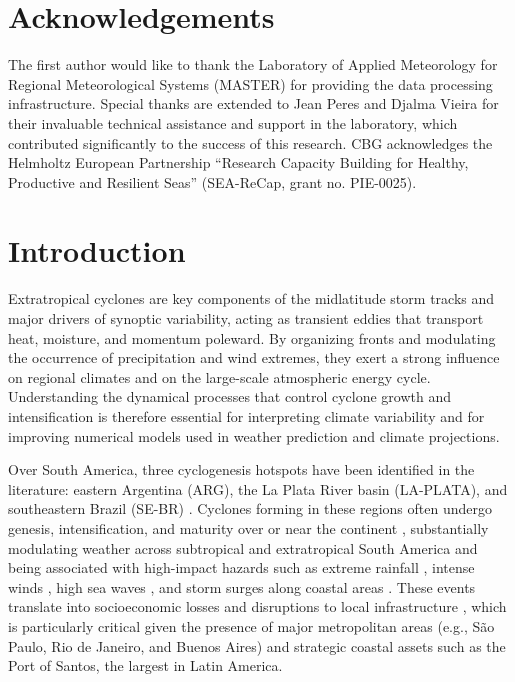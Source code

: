 \documentclass[pdflatex,sn-chicago]{sn-jnl}%
\theoremstyle{plain}
\theoremstyle{definition}
\theoremstyle{remark}
\theoremstyle{definition}
\begin{document}
\section*{Acknowledgements}

The first author would like to thank the Laboratory of Applied Meteorology for Regional Meteorological Systems (MASTER) for providing the data processing infrastructure. Special thanks are extended to Jean Peres and Djalma Vieira for their invaluable technical assistance and support in the laboratory, which contributed significantly to the success of this research. CBG acknowledges the Helmholtz European Partnership “Research Capacity Building for Healthy, Productive and Resilient Seas” (SEA-ReCap, grant no. PIE-0025).

\section{Introduction}\label{sec1}

Extratropical cyclones are key components of the midlatitude storm tracks and major drivers of synoptic variability, acting as transient eddies that transport heat, moisture, and momentum poleward. By organizing fronts and modulating the occurrence of precipitation and wind extremes, they exert a strong influence on regional climates and on the large-scale atmospheric energy cycle. Understanding the dynamical processes that control cyclone growth and intensification is therefore essential for interpreting climate variability and for improving numerical models used in weather prediction and climate projections.

Over South America, three cyclogenesis hotspots have been identified in the literature: eastern Argentina (ARG), the La Plata River basin (LA-PLATA), and southeastern Brazil (SE-BR) \citep{gan1991surface,hoskins2005new,gramcianinov2019properties,crespo2021potential}. Cyclones forming in these regions often undergo genesis, intensification, and maturity over or near the continent \citep{couto2024new}, substantially modulating weather across subtropical and extratropical South America and being associated with high-impact hazards such as extreme rainfall \citep[e.g.,][]{de2021ocean,de2024extreme}, intense winds \citep{cardoso2022synoptic,de2021ocean}, high sea waves \citep{da2025classification,gramcianinov2023impact}, and storm surges along coastal areas \citep{Leal2026WeatherPatterns,tecchio2024mean}. These events translate into socioeconomic losses and disruptions to local infrastructure \citep[e.g.][]{da2022climate,marengo2024impactos}, which is particularly critical given the presence of major metropolitan areas (e.g., São Paulo, Rio de Janeiro, and Buenos Aires) and strategic coastal assets such as the Port of Santos, the largest in Latin America.
\end{document}
